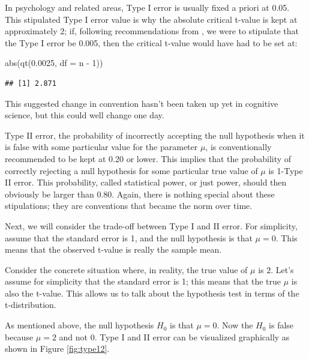 \documentclass[
  12pt,
]{krantz}
\newenvironment{Shaded}{\begin{snugshade}}{\end{snugshade}}
\newcommand{\AttributeTok}[1]{\textcolor[rgb]{0.77,0.63,0.00}{#1}}
\newcommand{\DecValTok}[1]{\textcolor[rgb]{0.00,0.00,0.81}{#1}}
\newcommand{\FloatTok}[1]{\textcolor[rgb]{0.00,0.00,0.81}{#1}}
\newcommand{\FunctionTok}[1]{\textcolor[rgb]{0.00,0.00,0.00}{#1}}
\newcommand{\NormalTok}[1]{#1}
\newcommand{\SpecialCharTok}[1]{\textcolor[rgb]{0.00,0.00,0.00}{#1}}
\theoremstyle{definition}
\theoremstyle{definition}
\theoremstyle{definition}
\theoremstyle{definition}
\theoremstyle{remark}
\begin{document}
In psychology and related areas, Type I error is usually fixed a priori at 0.05. This stipulated Type I error value is why the absolute critical t-value is kept at approximately \(2\); if, following recommendations from \citet{benjamin2018redefine}, we were to stipulate that the Type I error be 0.005, then the critical t-value would have had to be set at:

\begin{Shaded}
\begin{Highlighting}[]
\FunctionTok{abs}\NormalTok{(}\FunctionTok{qt}\NormalTok{(}\FloatTok{0.0025}\NormalTok{, }\AttributeTok{df =}\NormalTok{ n }\SpecialCharTok{{-}} \DecValTok{1}\NormalTok{))}
\end{Highlighting}
\end{Shaded}

\begin{verbatim}
## [1] 2.871
\end{verbatim}

This suggested change in convention hasn't been taken up yet in cognitive science, but this could well change one day.

Type II error, the probability of incorrectly accepting the null hypothesis when it is false with some particular value for the parameter \(\mu\), is conventionally recommended \citep{powerbookcohen} to be kept at 0.20 or lower. This implies that the probability of correctly rejecting a null hypothesis for some particular true value of \(\mu\) is 1-Type II error. This probability, called statistical power, or just power, should then obviously be larger than 0.80. Again, there is nothing special about these stipulations; they are conventions that became the norm over time.

Next, we will consider the trade-off between Type I and II error. For simplicity, assume that the standard error is 1, and the null hypothesis is that \(\mu=0\). This means that the observed t-value is really the sample mean.

Consider the concrete situation where, in reality, the true value of \(\mu\) is \(2\). Let's assume for simplicity that the standard error is 1; this means that the true \(\mu\) is also the t-value. This allows us to talk about the hypothesis test in terms of the t-distribution.

As mentioned above, the null hypothesis \(H_0\) is that \(\mu=0\). Now the \(H_0\) is false because \(\mu=2\) and not \(0\). Type I and II error can be visualized graphically as shown in Figure \ref{fig:type12}.
\end{document}
